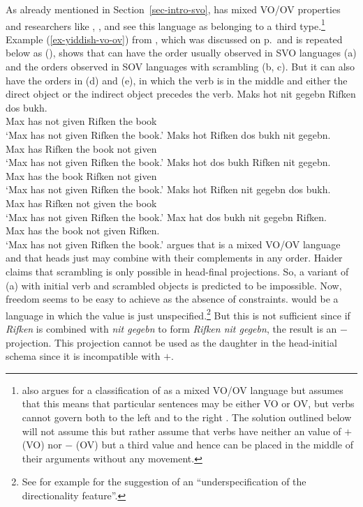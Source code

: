 As already mentioned in Section~\ref{sec-intro-svo},  has mixed VO/OV properties and
researchers like \citet[]{dBMvW86a}, \citet[]{Schallert2007a}, and \textcites[]{Haider2010a}{Haider2020a} see
this language as belonging to a third type.\footnote{
  \textcites{Santorini93a} also argues for a classification of  as a mixed VO/OV language
  but assumes that this means that particular sentences may be either VO or OV, but verbs cannot
  govern both to the left and to the right \citet[]{Santorini93a}. The solution outlined below
  will not assume this but rather assume that  verbs have neither an \initial value of $+$
  (VO) nor $-$ (OV) but a third value and hence can be placed in the middle of their arguments
  without any movement.
} Example (\ref{ex-yiddish-vo-ov}) from \citet[]{Diesing97a}, which was discussed on p.\,\pageref{ex-yiddish-vo-ov} and is repeated
below as (), shows that  can have the order usually observed in SVO languages
(a) and the orders observed in SOV languages with scrambling (b, c). But it can also
have the orders in (d) and (e), in which the verb is in the middle and either the
direct object or the indirect object precedes the verb.
\eal
\ex
\gll Maks hot nit gegebn Rifken dos bukh.\\
     Max  has not given  Rifken the book\\\yiddish
\glt `Max has not given Rifken the book.' 
\ex 
\gll Maks hot Rifken dos bukh nit gegebn.\\
     Max  has Rifken the book not given\\
\glt `Max has not given Rifken the book.'
\ex
\gll Maks hot dos bukh Rifken nit gegebn.\\
     Max  has the book Rifken not given\\
\glt `Max has not given Rifken the book.'
\ex
\gll Maks hot Rifken nit gegebn dos bukh.\\
     Max  has Rifken not given  the book\\
\glt `Max has not given Rifken the book.'
\ex
\glt Max hat dos bukh nit gegebn Rifken.\\
     Max has the book not given  Rifken.\\
\glt `Max has not given Rifken the book.'
\zl
\citet[]{Haider2010a} argues that  is a mixed VO/OV language and that heads just may
combine with their complements in any order. Haider claims that scrambling is only possible in
head-final projections. So, a variant of (a) with initial verb and scrambled objects is
predicted to be impossible.
 Now,
freedom seems to be easy to achieve as the absence of constraints.  would be a language in
which the \initial value is just unspecified.\footnote{
See for example  for the suggestion of an ``underspecification of the
directionality feature''.} 
But this is not sufficient since if \emph{Rifken} is
combined with \emph{nit gegebn} to form \emph{Rifken nit gegebn}, the result is an \initial{}$-$
projection. This projection cannot be used as the daughter in the head-initial schema since it is
incompatible with \initial{}$+$. 

